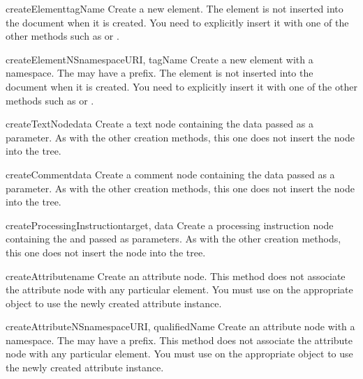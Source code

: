 \begin{methoddesc}[Document]{createElement}{tagName}
Create a new element.  The element is not inserted into the document
when it is created.  You need to explicitly insert it with one of the
other methods such as  or
.
\end{methoddesc}

\begin{methoddesc}[Document]{createElementNS}{namespaceURI, tagName}
Create a new element with a namespace.  The  may have a
prefix.  The element is not inserted into the document when it is
created.  You need to explicitly insert it with one of the other
methods such as  or .
\end{methoddesc}

\begin{methoddesc}[Document]{createTextNode}{data}
Create a text node containing the data passed as a parameter.  As with
the other creation methods, this one does not insert the node into the
tree.
\end{methoddesc}

\begin{methoddesc}[Document]{createComment}{data}
Create a comment node containing the data passed as a parameter.  As
with the other creation methods, this one does not insert the node
into the tree.
\end{methoddesc}

\begin{methoddesc}[Document]{createProcessingInstruction}{target, data}
Create a processing instruction node containing the  and
 passed as parameters.  As with the other creation methods,
this one does not insert the node into the tree.
\end{methoddesc}

\begin{methoddesc}[Document]{createAttribute}{name}
Create an attribute node.  This method does not associate the
attribute node with any particular element.  You must use
 on the appropriate  object
to use the newly created attribute instance.
\end{methoddesc}

\begin{methoddesc}[Document]{createAttributeNS}{namespaceURI, qualifiedName}
Create an attribute node with a namespace.  The  may have
a prefix.  This method does not associate the attribute node with any
particular element. You must use  on the
appropriate  object to use the newly created attribute
instance.
\end{methoddesc}

